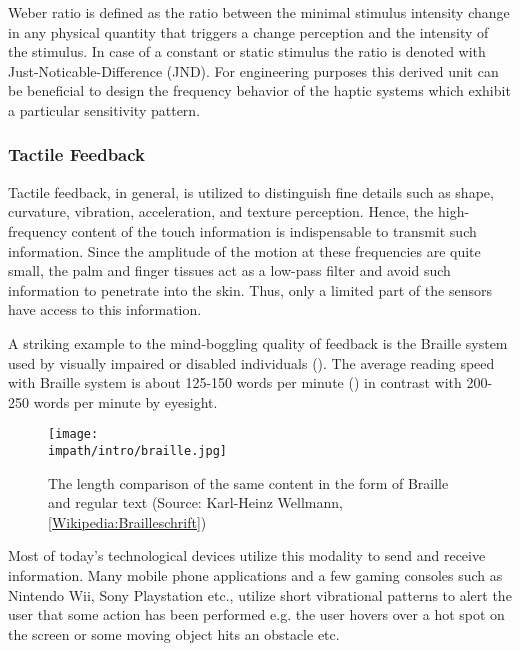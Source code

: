 Weber ratio is defined as the ratio between the minimal stimulus intensity change in any physical quantity that triggers a change perception and the intensity of the stimulus. In case of a constant or static stimulus the ratio is denoted with Just-Noticable-Difference (JND). For engineering purposes this derived unit can be beneficial to design the frequency behavior of the haptic systems which exhibit a particular sensitivity pattern.


\subsubsection{Tactile Feedback}

Tactile feedback, in general, is utilized to distinguish fine details such as shape, curvature, vibration, acceleration, and texture perception. Hence, the high-frequency content of the touch information is indispensable to transmit such information. Since the amplitude of the motion at these frequencies are quite small, the palm and finger tissues act as a low-pass filter and avoid such information to penetrate into the skin. Thus, only a limited part of the sensors have access to this information.

A striking example to the mind-boggling quality of feedback is the Braille system used by visually impaired or disabled individuals (). The average reading speed with Braille system is about 125-150 words per minute (\cite{americanblind}) in contrast with 200-250 words per minute by eyesight. 

\begin{figure}%
\centering
\texttt{[image: \\impath/intro/braille.jpg]}%
\caption[The length comparison of the same content in the form of Braille and 
regular text]{The length comparison of the same content in the form of Braille and 
regular text (Source: Karl-Heinz Wellmann, 
\href{http://de.wikipedia.org/wiki/Brailleschrift}{[Wikipedia:Brailleschrift]})}%
\label{fig:braille}%
\end{figure}

Most of today's technological devices utilize this modality to send and receive information. Many mobile phone applications and a few gaming consoles such as Nintendo Wii\raisebox{0.5ex}{\scriptsize\texttrademark}, Sony Playstation\raisebox{0.5ex}{\scriptsize\texttrademark} etc., utilize short vibrational patterns to alert the user that some action has been performed e.g. the user hovers over a hot spot on the screen or some moving object hits an obstacle etc. 

